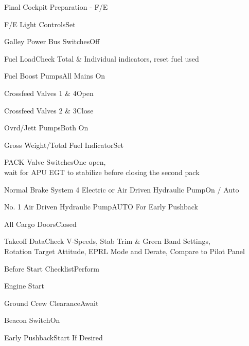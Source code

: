 \documentclass[sim-use, blue_items]{checklist}
\begin{document}
\begin{checklist}{Final Cockpit Preparation - F/E}
	\item{F/E Light Controls}{Set}
	\item{Galley Power Bus Switches}{Off}
	\item{Fuel Load}{Check Total \& Individual indicators, reset fuel used}
	\item{Fuel Boost Pumps}{All Mains On}
	\item{Crossfeed Valves 1 \& 4}{Open}
	\item{Crossfeed Valves 2 \& 3}{Close}
	 {
		\item{Ovrd/Jett Pumps}{Both On}
	}
	\item{Gross Weight/Total Fuel Indicator}{Set}
	\item{PACK Valve Switches}{One open,\\wait for APU EGT to stabilize before closing the second pack}
	 {
		\item{Normal Brake System 4 Electric or Air Driven Hydraulic Pump}{On / Auto}
		\item{No. 1 Air Driven Hydraulic Pump}{AUTO For Early Pushback}
	}
	\item{All Cargo Doors}{Closed}
	\item{Takeoff Data}{Check V-Speeds, Stab Trim \& Green Band Settings,\\Rotation Target Attitude, EPRL Mode and Derate, Compare to Pilot Panel}
	\item{Before Start Checklist}{Perform} %
\end{checklist}


\begin{checklist}{Engine Start}
	\item{Ground Crew Clearance}{Await}
	\item{Beacon Switch}{On}
	\item{Early Pushback}{Start If Desired}
\end{checklist}
\end{document}
